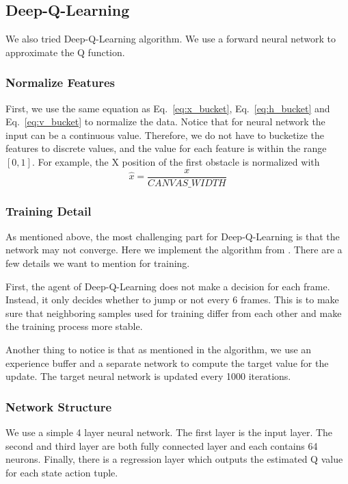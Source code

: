 \documentclass[conference]{IEEEtran}
\begin{document}
\subsection{Deep-Q-Learning}
We also tried Deep-Q-Learning algorithm. We use a forward neural network to approximate the Q function. 

\subsubsection{Normalize Features}
First, we use the same equation as Eq.~\ref{eq:x_bucket}, Eq.~\ref{eq:h_bucket} and Eq.~\ref{eq:v_bucket} to normalize the data. Notice that for neural network the input can be a continuous value. Therefore, we do not have to bucketize the features to discrete values, and the value for each feature is within the range $[0, 1]$. For example, the X position of the first obstacle is normalized with
\begin{equation}
    \hat{x}=\frac{x}{CANVAS\_WIDTH}
\end{equation}

\subsubsection{Training Detail}
As mentioned above, the most challenging part for Deep-Q-Learning is that the network may not converge. Here we implement the algorithm from \cite{mnih2015humanlevel}. There are a few details we want to mention for training. 

First, the agent of Deep-Q-Learning does not make a decision for each frame. Instead, it only decides whether to jump or not every 6 frames. This is to make sure that neighboring samples used for training differ from each other and make the training process more stable. 

Another thing to notice is that as mentioned in the algorithm, we use an experience buffer and a separate network to compute the target value for the update. The target neural network is updated every 1000 iterations.

\subsubsection{Network Structure}
We use a simple 4 layer neural network. The first layer is the input layer. The second and third layer are both fully connected layer and each contains 64 neurons. Finally, there is a regression layer which outputs the estimated Q value for each state action tuple.
\end{document}
